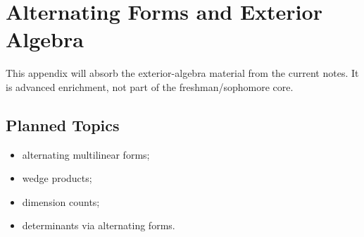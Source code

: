 \chapter{Alternating Forms and Exterior Algebra}
\label{app:exterior-algebra}

\begin{draftbox}
This appendix will absorb the exterior-algebra material from the current
notes. It is advanced enrichment, not part of the freshman/sophomore core.
\end{draftbox}

\section{Planned Topics}

\begin{itemize}
  \item alternating multilinear forms;
  \item wedge products;
  \item dimension counts;
  \item determinants via alternating forms.
\end{itemize}
